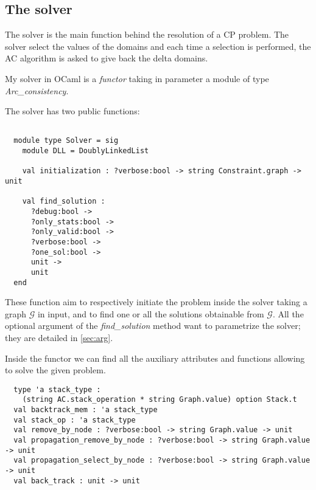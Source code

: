 \documentclass{rapport}
\begin{document}
\subsection{The solver}

The solver is the main function behind the resolution of a CP problem. The solver select the values of the domains and each time a selection is performed, the AC algorithm is asked to give back the delta domains.

My solver in OCaml is a \textit{functor} taking in parameter a module of type \textit{Arc\_consistency}.

The solver has two public functions:
\begin{verbatim}

  module type Solver = sig
    module DLL = DoublyLinkedList

    val initialization : ?verbose:bool -> string Constraint.graph -> unit

    val find_solution :
      ?debug:bool ->
      ?only_stats:bool ->
      ?only_valid:bool ->
      ?verbose:bool ->
      ?one_sol:bool ->
      unit ->
      unit
  end

\end{verbatim}

These function aim to respectively initiate the problem inside the solver taking a graph $\mathcal{G}$ in input, and to find one or all the solutions obtainable from $\mathcal{G}$. All the optional argument of the \textit{find\_solution} method want to parametrize the solver; they are detailed in \cref{sec:arg}.

Inside the functor we can find all the auxiliary attributes and functions allowing to solve the given problem.

\begin{verbatim}
  type 'a stack_type :
    (string AC.stack_operation * string Graph.value) option Stack.t
  val backtrack_mem : 'a stack_type 
  val stack_op : 'a stack_type
  val remove_by_node : ?verbose:bool -> string Graph.value -> unit
  val propagation_remove_by_node : ?verbose:bool -> string Graph.value -> unit
  val propagation_select_by_node : ?verbose:bool -> string Graph.value -> unit
  val back_track : unit -> unit
\end{verbatim}
\end{document}
